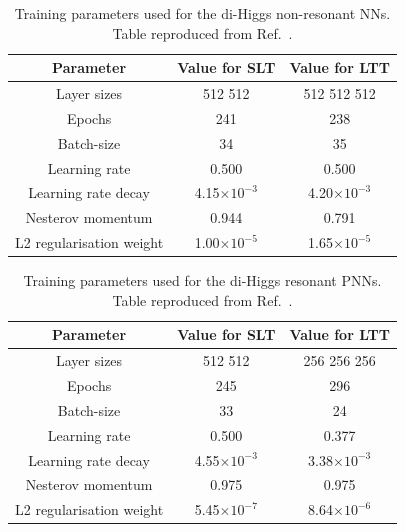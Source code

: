 \begin{table}
  \centering
  \small
  \begin{tabular}{|c|c|c|}
    \hline
    Parameter & Value for SLT & Value for LTT\\
    \hline
    Layer sizes & 512 512 & 512 512 512\\
    Epochs & 241 & 238\\
    Batch-size & 34 & 35\\
    Learning rate & 0.500 & 0.500\\
    Learning rate decay & 4.15$\times 10^{-3}$ & 4.20$\times 10^{-3}$\\
    Nesterov momentum & 0.944 & 0.791\\
    L2 regularisation weight & 1.00$\times 10^{-5}$ & 1.65$\times 10^{-5}$\\
    \hline
  \end{tabular}
  \caption{Training parameters used for the di-Higgs \lephad non-resonant NNs.
  Table reproduced from Ref.~\cite{dihiggs-conf}.}
  \label{tab:parameters_NN_LepHad}
\end{table}

\begin{table}
  \centering
  \small
  \begin{tabular}{|c|c|c|}
    \hline
    Parameter & Value for SLT & Value for LTT\\
    \hline
    Layer sizes & 512 512 & 256 256 256\\
    Epochs & 245 & 296\\
    Batch-size & 33 & 24\\
    Learning rate & 0.500 & 0.377\\
    Learning rate decay & 4.55$\times 10^{-3}$ & 3.38$\times 10^{-3}$\\
    Nesterov momentum & 0.975 & 0.975\\
    L2 regularisation weight & 5.45$\times 10^{-7}$ & 8.64$\times 10^{-6}$\\
    \hline
  \end{tabular}
  \caption{Training parameters used for the di-Higgs \lephad resonant PNNs.
  Table reproduced from Ref.~\cite{dihiggs-conf}.}
  \label{tab:parameters_PNN_LepHad}
\end{table}


